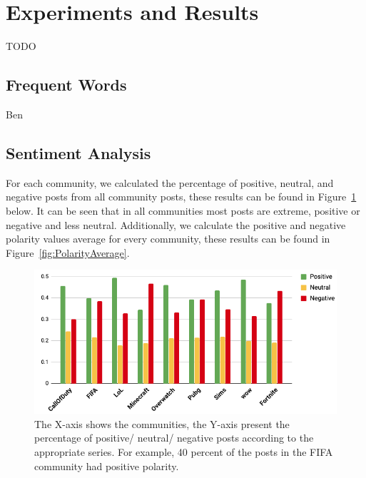 \section{Experiments and Results}
TODO
\subsection{Frequent Words}
Ben
\subsection{Sentiment Analysis}
For each community, we calculated the percentage of positive, neutral, and negative posts from all community posts, these results can be found in Figure~\ref{fig:Polarity} below. It can be seen that in all communities most posts are extreme, positive or negative and less neutral.
Additionally, we calculate the positive and negative polarity values average for every community, these results can be found in Figure~\ref{fig:PolarityAverage}.

\begin{figure}[h]
    \begin{center}
        \includegraphics[scale=0.32]{Images/Polarity.png}
    \end{center}
    \caption{The X-axis shows the communities, the Y-axis present the percentage of positive/ neutral/ negative posts according to the appropriate series. For example, 40 percent of the posts in the FIFA community had positive polarity.}
    \label{fig:Polarity}
\end{figure}

